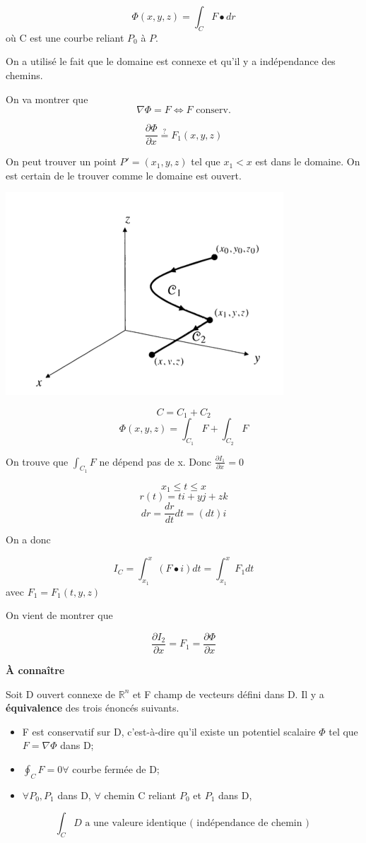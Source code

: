 \[\Phi (x,y,z ) =\int_C F\bullet dr \]
où C est une courbe reliant $P_0$ à $P$.

On a utilisé le fait que le domaine est connexe et qu'il y a indépendance des chemins.

On va montrer que \[\nabla \Phi = F \Longleftrightarrow F \text{ conserv.} \]

\[\frac{\partial \Phi}{\partial x} \overset{?}{=} F_1 (x,y,z) \]

On peut trouver un point $P' = ( x_1,y,z)$ tel que $x_1 < x$ est dans le domaine. On est certain de le trouver comme le domaine est ouvert.

\includegraphics[scale=0.7]{image4.png}

\[C=C_1+C_2\]
\[\Phi (x,y,z) = \int_{C_1} F + \int_{C_2} F\]

On trouve que $\int_{C_1} F$ ne dépend pas de x. Donc $\frac{\partial I_1}{\partial x }=0$

\[x_1\leqslant t \leqslant x \]
\[r(t) = t i +yj + zk \]
\[dr = \frac{dr}{dt}dt = (dt)i\]

On a donc

\[I_C = \int_{x_1}^x (F\bullet i)dt = \int_{x_1}^x F_1 dt\] avec $F_1 = F_1 ( t,y,z )$

On vient de montrer que

\[\frac{\partial I_2	}{\partial x} = F_1 = \frac{\partial \Phi}{\partial x}\]


\begin{mytheo}

\textbf{À connaître}

Soit D ouvert connexe de $\mathbb{R}^n$ et F champ de vecteurs défini dans D. Il y a \textbf{équivalence} des trois énoncés suivants.

\begin{itemize}
\item F est conservatif sur D, c'est-à-dire qu'il existe un potentiel scalaire $\Phi$ tel que $F=\nabla \Phi $ dans D;
\item $\oint_C F =0 \forall $ courbe fermée de D;
\item $\forall P_0,P_1$ dans D, $\forall$ chemin C reliant $P_0$ et $P_1$ dans D,
\end{itemize}
\[\int_C D \text{ a une valeure identique ( indépendance de chemin ) }\]

\end{mytheo}

